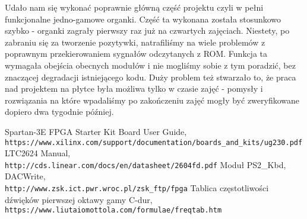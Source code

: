 \documentclass[11pt]{report}
\begin{document}
Udało nam się wykonać poprawnie główną część projektu czyli w pełni funkcjonalne jedno-gamowe organki. Część ta wykonana została stosunkowo szybko - organki zagrały pierwszy raz już na czwartych zajęciach. Niestety, po zabraniu się za tworzenie pozytywki, natrafiliśmy na wiele problemów z poprawnym przekierowaniem sygnałów odczytanych z ROM. Funkcja ta wymagała obejścia obecnych modułów i nie mogliśmy sobie z tym poradzić, bez znaczącej degradacji istniejącego kodu. Duży problem też stwarzało to, że praca nad projektem na płytce była możliwa tylko w czasie zajęć - pomysły i rozwiązania na które wpadaliśmy po zakończeniu zajęć mogły być zweryfikowane dopiero dwa tygodnie później.


\begin{thebibliography}{9}		
	Spartan-3E FPGA Starter Kit Board User Guide,
	\\\texttt{https://www.xilinx.com/support/documentation/boards\_and\_kits/ug230.pdf}
	LTC2624 Manual,
	\\\texttt{http://cds.linear.com/docs/en/datasheet/2604fd.pdf}
	Moduł PS2\_Kbd, DACWrite,
	\\\texttt{http://www.zsk.ict.pwr.wroc.pl/zsk\_ftp/fpga}
	 Tablica częstotliwości dźwięków pierwszej oktawy gamy C-dur,
	\\\texttt{https://www.liutaiomottola.com/formulae/freqtab.htm}
\end{thebibliography}
	
\end{document}
